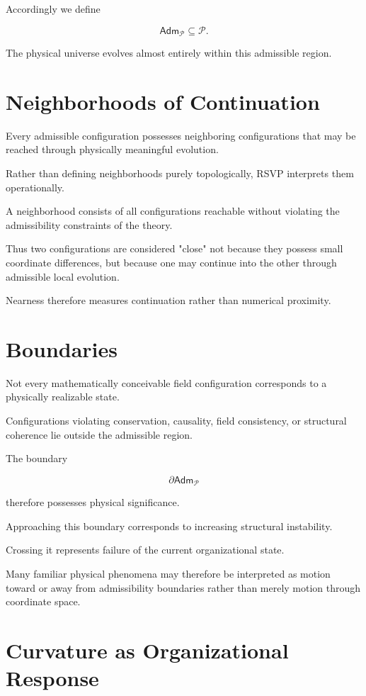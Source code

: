 \documentclass[11pt,oneside]{book}
\numberwithin{equation}{chapter}
\theoremstyle{definition}
\theoremstyle{plain}
\newcommand{\Adm}{\mathsf{Adm}}
\begin{document}
Accordingly we define

\[
\Adm_{\mathcal P}
\subseteq
\mathcal P.
\]

The physical universe evolves almost entirely within this admissible region.

\section{Neighborhoods of Continuation}

Every admissible configuration possesses neighboring configurations that may
be reached through physically meaningful evolution.

Rather than defining neighborhoods purely topologically, RSVP interprets
them operationally.

A neighborhood consists of all configurations reachable without violating
the admissibility constraints of the theory.

Thus two configurations are considered "close" not because they possess
small coordinate differences, but because one may continue into the other
through admissible local evolution.

Nearness therefore measures continuation rather than numerical proximity.

\section{Boundaries}

Not every mathematically conceivable field configuration corresponds to a
physically realizable state.

Configurations violating conservation, causality, field consistency, or
structural coherence lie outside the admissible region.

The boundary

\[
\partial\Adm_{\mathcal P}
\]

therefore possesses physical significance.

Approaching this boundary corresponds to increasing structural instability.

Crossing it represents failure of the current organizational state.

Many familiar physical phenomena may therefore be interpreted as motion
toward or away from admissibility boundaries rather than merely motion
through coordinate space.

\section{Curvature as Organizational Response}
\end{document}
